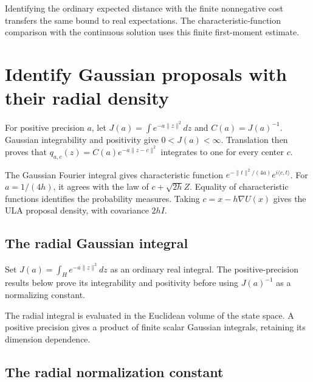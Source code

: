 \documentclass[11pt,a4paper]{report}
\begin{document}
Identifying the ordinary expected distance with the finite nonnegative cost transfers the same bound to real expectations. The characteristic-function comparison with the continuous solution uses this finite first-moment estimate.

\section{\texorpdfstring{Identify Gaussian proposals with their radial density}{Identify Gaussian proposals with their radial density}}
\label{proof-module-UnadjustedLangevin-GaussianProposalDensity-lean}


For positive precision \(a\), let \(J(a)=\int e^{-a\|z\|^2}dz\) and \(C(a)=J(a)^{-1}\). Gaussian integrability and positivity give \(0<J(a)<\infty\). Translation then proves that \(q_{a,c}(z)=C(a)e^{-a\|z-c\|^2}\) integrates to one for every center \(c\).



The Gaussian Fourier integral gives characteristic function \(e^{-\|t\|^2/(4a)}e^{i\langle c,t\rangle}\). For \(a=1/(4h)\), it agrees with the law of \(c+\sqrt{2h}Z\). Equality of characteristic functions identifies the probability measures. Taking \(c=x-h\nabla U(x)\) gives the ULA proposal density, with covariance \(2hI\).

\subsection{\texorpdfstring{The radial Gaussian integral}{The radial Gaussian integral}}
\label{report-step-UnadjustedLangevin-GaussianProposalDensity-lean-1}


Set \(J(a)=\int_H e^{-a\|z\|^2}dz\) as an ordinary real integral. The positive-precision results below prove its integrability and positivity before using \(J(a)^{-1}\) as a normalizing constant.



The radial integral is evaluated in the Euclidean volume of the state space. A positive precision gives a product of finite scalar Gaussian integrals, retaining its dimension dependence.

\subsection{\texorpdfstring{The radial normalization constant}{The radial normalization constant}}
\label{report-step-UnadjustedLangevin-GaussianProposalDensity-lean-2}
\end{document}
